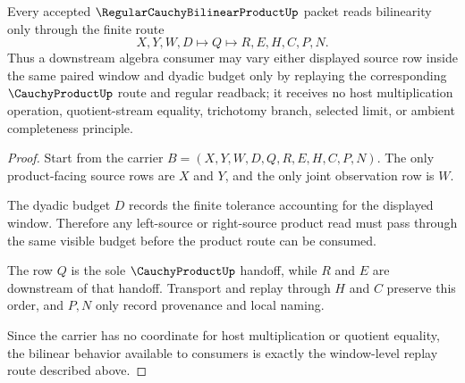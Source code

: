 \begin{theorem}
\label{thm:regular-cauchy-bilinear-product-window-bilinearity}
Every accepted $\RegularCauchyBilinearProductUp$ packet reads bilinearity only through the finite route
$$
X,Y,W,D \longmapsto Q \longmapsto R,E,H,C,P,N .
$$
Thus a downstream algebra consumer may vary either displayed source row inside the same paired window and dyadic budget only by replaying the corresponding $\CauchyProductUp$ route and regular readback; it receives no host multiplication operation, quotient-stream equality, trichotomy branch, selected limit, or ambient completeness principle.
\end{theorem}
\begin{proof}
Start from the carrier $B=(X,Y,W,D,Q,R,E,H,C,P,N)$. The only product-facing source rows are $X$ and $Y$, and the only joint observation row is $W$.

The dyadic budget $D$ records the finite tolerance accounting for the displayed window. Therefore any left-source or right-source product read must pass through the same visible budget before the product route can be consumed.

The row $Q$ is the sole $\CauchyProductUp$ handoff, while $R$ and $E$ are downstream of that handoff. Transport and replay through $H$ and $C$ preserve this order, and $P,N$ only record provenance and local naming.

Since the carrier has no coordinate for host multiplication or quotient equality, the bilinear behavior available to consumers is exactly the window-level replay route described above.
\end{proof}


